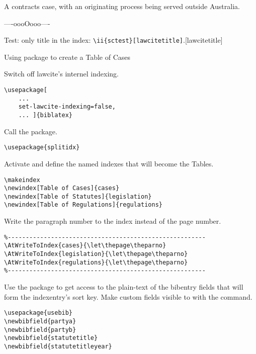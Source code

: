 \p A contracts case, with an originating process being served outside Australia.

\bigskip
\bigskip
\hfill ----oooOooo---- \hfill\ 

\newpage
\p Test: only title in the index: \verb.\ii{sctest}[lawcitetitle]..[lawcitetitle]

\bigskip

\bigskip

\bigskip
{\Large Using  package to create a Table of Cases}

\bigskip
{}


\ye
\yin Switch off lawcite's internel indexing.
\yq
\begin{verbatim}
\usepackage[
	...
	set-lawcite-indexing=false,
	...	]{biblatex}
\end{verbatim}
\yqq

\yin Call the  package.
\yq
\begin{verbatim}
\usepackage{splitidx}
\end{verbatim}
\yqq

\yin Activate  and define the named indexes that will become the Tables.
\yq
\begin{verbatim}
\makeindex
\newindex[Table of Cases]{cases}
\newindex[Table of Statutes]{legislation}
\newindex[Table of Regulations]{regulations}
\end{verbatim}
\yqq



\yin Write the paragraph number to the index instead of the page number.
\yq
\begin{verbatim}
%-------------------------------------------------------
\AtWriteToIndex{cases}{\let\thepage\theparno}
\AtWriteToIndex{legislation}{\let\thepage\theparno}
\AtWriteToIndex{regulations}{\let\thepage\theparno}
%-------------------------------------------------------
\end{verbatim}
\yqq



\yin Use the  package to get access to the plain-text of the bibentry fields that will form the indexentry's sort key. Make custom fields visible to  with the  command.
\yq
\begin{verbatim}
\usepackage{usebib}
\newbibfield{partya}
\newbibfield{partyb}
\newbibfield{statutetitle}
\newbibfield{statutetitleyear}
\end{verbatim}
\yqq

